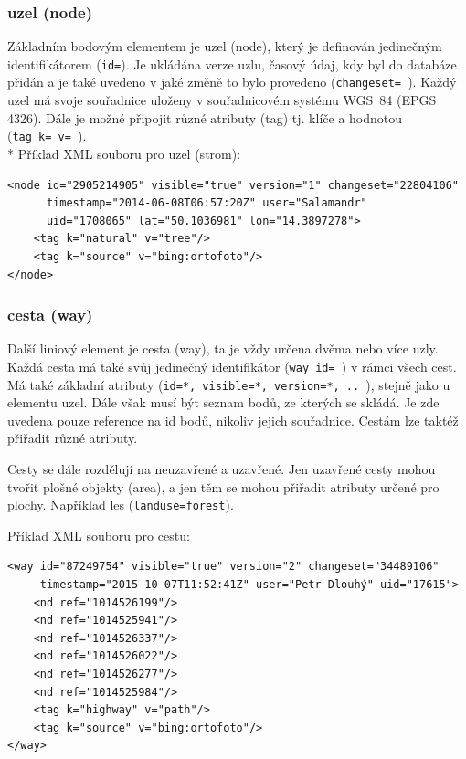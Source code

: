 \subsubsection{uzel (node) }

Základním bodovým elementem je uzel (node), který je definován jedinečným
identifikátorem ({\tt id=}). 
Je ukládána verze uzlu, časový údaj, kdy byl do databáze přidán
a je také uvedeno v jaké změně to bylo provedeno ({\tt changeset=~}).
Každý uzel má svoje souřadnice uloženy v souřadnicovém systému WGS~84 (EPGS 4326). 
Dále je možné připojit různé atributy (tag) tj. klíče a hodnotou ({\tt tag~k=~v=~}).
\\*
Příklad XML souboru pro uzel (strom):

{\scriptsize \begin{lstlisting}
<node id="2905214905" visible="true" version="1" changeset="22804106" 
      timestamp="2014-06-08T06:57:20Z" user="Salamandr" 
      uid="1708065" lat="50.1036981" lon="14.3897278">
    <tag k="natural" v="tree"/>
    <tag k="source" v="bing:ortofoto"/>
</node>
\end{lstlisting} }

\subsubsection{cesta (way) }

Další liniový element je cesta (way), ta je vždy určena dvěma nebo více uzly.
Každá cesta má také svůj jedinečný identifikátor ({\tt way~id=~}) v rámci všech cest.
Má také základní atributy ({\tt id=*, visible=*, version=*, .. }), 
stejně jako u elementu uzel.
Dále však musí být seznam bodů, ze kterých se skládá.
Je zde uvedena pouze reference na id bodů, nikoliv jejich souřadnice.
Cestám lze taktéž přiřadit různé atributy.

Cesty se dále rozdělují na neuzavřené a uzavřené.
Jen uzavřené cesty mohou tvořit plošné objekty (area),
a jen těm se mohou přiřadit atributy určené pro plochy.
Například les ({\tt landuse=forest}).

Příklad XML souboru pro cestu:

{\scriptsize
\begin{lstlisting}
<way id="87249754" visible="true" version="2" changeset="34489106"
     timestamp="2015-10-07T11:52:41Z" user="Petr Dlouhý" uid="17615">
    <nd ref="1014526199"/>
    <nd ref="1014525941"/>
    <nd ref="1014526337"/>
    <nd ref="1014526022"/>
    <nd ref="1014526277"/>
    <nd ref="1014525984"/>
    <tag k="highway" v="path"/>
    <tag k="source" v="bing:ortofoto"/>
</way>
\end{lstlisting}
}
      
